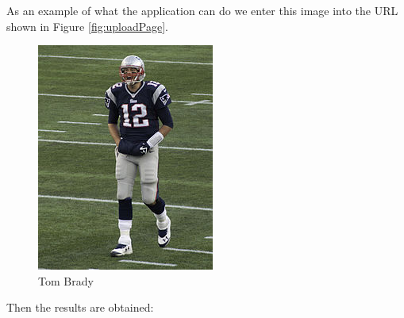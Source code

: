 \documentclass{scrreprt}
\begin{document}
As an example of what the application can do we enter this image into the URL
shown in Figure \ref{fig:uploadPage}.

\begin{figure}
  \includegraphics[width=\linewidth]{tbrady.jpg}
  \caption{Tom Brady}
  \label{fig:tomBrady}
\end{figure}

Then the results are obtained:
\end{document}

